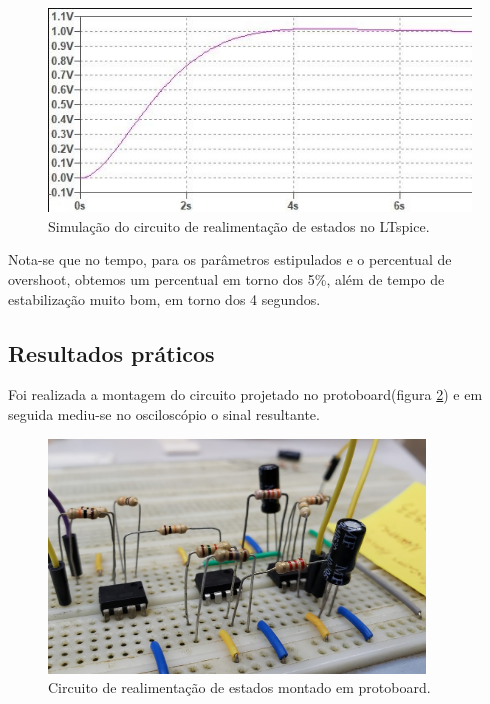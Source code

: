 \begin{figure}[H]
\begin{center}
    \includegraphics[width=12cm]{images/state/simulacao.jpg}  
\end{center}
\caption{Simulação do circuito de realimentação de estados no LTspice.}
\label{rea:3} 
\end{figure}

Nota-se que no tempo, para os parâmetros estipulados e o percentual de overshoot, obtemos um percentual em torno dos 5\%, além de tempo de estabilização muito bom, em torno dos 4 segundos.

\subsection{Resultados práticos}

Foi realizada a montagem do circuito projetado no protoboard(figura \ref{rea:2}) e em seguida mediu-se no osciloscópio o sinal resultante.

\begin{figure}[H]
\begin{center}
    \includegraphics[width=10cm]{images/state/circ_controle.jpeg}  
\end{center}
\caption{Circuito de realimentação de estados montado em protoboard.}
\label{rea:2} 
\end{figure}

